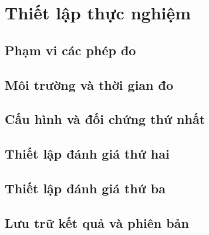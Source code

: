 \par{}
\section{Thiết lập thực nghiệm}\label{section:setup-1}

\par{}
\subsection{Phạm vi các phép đo}\label{subsection:setup-2}

\par{}
\subsection{Môi trường và thời gian đo}\label{subsection:setup-3}

\par{}
\subsection{Cấu hình và đối chứng thứ nhất}\label{subsection:setup-4}

\par{}
\subsection{Thiết lập đánh giá thứ hai}\label{subsection:setup-5}

\par{}
\subsection{Thiết lập đánh giá thứ ba}\label{subsection:setup-6}

\par{}
\subsection{Lưu trữ kết quả và phiên bản}\label{subsection:setup-7}

